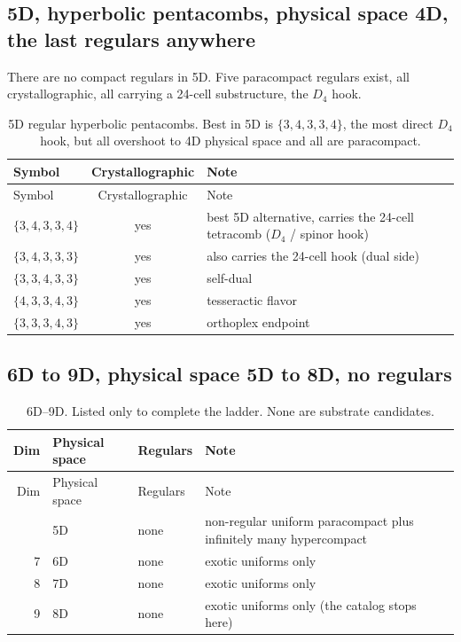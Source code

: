 \subsection{5D, hyperbolic pentacombs, physical space 4D, the last regulars anywhere}

There are no compact regulars in 5D. Five paracompact regulars exist, all crystallographic, all carrying a
24-cell substructure, the $D_4$ hook.

{\small
\begin{longtable}{l c p{4.0in}}
\toprule
Symbol & Crystallographic & Note \\
\midrule
\endfirsthead
\toprule
Symbol & Crystallographic & Note \\
\midrule
\endhead
\bottomrule
\endfoot
\bottomrule
\caption{5D regular hyperbolic pentacombs. Best in 5D is $\{3,4,3,3,4\}$, the most direct $D_4$ hook, but all
overshoot to 4D physical space and all are paracompact.}
\label{tab:catalog-5d}
\endlastfoot
$\{3,4,3,3,4\}$ & yes & best 5D alternative, carries the 24-cell tetracomb ($D_4$ / spinor hook) \\
$\{3,4,3,3,3\}$ & yes & also carries the 24-cell hook (dual side) \\
$\{3,3,4,3,3\}$ & yes & self-dual \\
$\{4,3,3,4,3\}$ & yes & tesseractic flavor \\
$\{3,3,3,4,3\}$ & yes & orthoplex endpoint \\
\end{longtable}}

\subsection{6D to 9D, physical space 5D to 8D, no regulars}

{\small
\begin{longtable}{r l l p{3.2in}}
\toprule
Dim & Physical space & Regulars & Note \\
\midrule
\endfirsthead
\toprule
Dim & Physical space & Regulars & Note \\
\midrule
\endhead
\bottomrule
\endfoot
\bottomrule
\caption{6D--9D. Listed only to complete the ladder. None are substrate candidates.}
\label{tab:catalog-6d-9d}
\endlastfoot
6 & 5D & none & non-regular uniform paracompact plus infinitely many hypercompact \\
7 & 6D & none & exotic uniforms only \\
8 & 7D & none & exotic uniforms only \\
9 & 8D & none & exotic uniforms only (the catalog stops here) \\
\end{longtable}}

